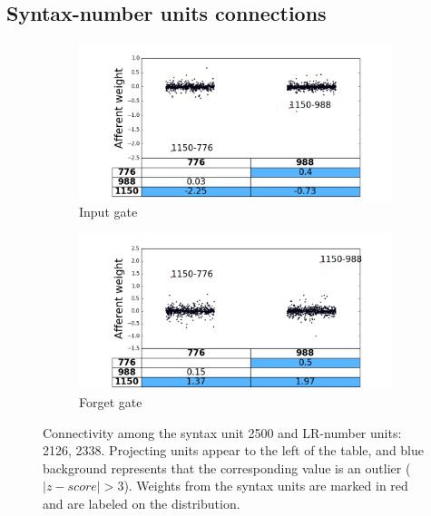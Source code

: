 \subsection{Syntax-number units connections}

\begin{figure}[t]
    \centering
    \begin{subfigure}{0.49\textwidth}
            \centering
            \includegraphics[width=\textwidth]{Figures/gate_Input_afferent_interactions.png}
            \caption{Input gate}
            \label{fig:interaction-input}
    \end{subfigure}
    \begin{subfigure}{0.49\textwidth}
           \centering
          \includegraphics[width=\textwidth]{Figures/gate_Forget_afferent_interactions.png}
          \caption{Forget gate}
          \label{fig:interaction-forget}
    \end{subfigure}
\caption{Connectivity among the syntax unit \unit{2}{500} and LR-number units: \unit{2}{126}, \unit{2}{338}. Projecting units appear to the left of the table, and blue background represents that the corresponding value is an outlier ($|z-score|>3$). Weights from the syntax units are marked in red and are labeled on the distribution. }
\label{fig:interaction}
\end{figure}


